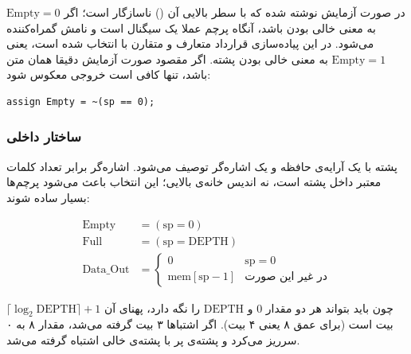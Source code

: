 \documentclass[10pt,a4paper]{article}
\begin{document}
 در صورت آزمایش نوشته شده  که با سطر بالایی آن () ناسازگار است؛ اگر $\mathrm{Empty}=0$ به معنی خالی بودن باشد، آنگاه پرچم عملا یک سیگنال  است و نامش گمراه‌کننده می‌شود. در این پیاده‌سازی قرارداد متعارف و متقارن با  انتخاب شده است، یعنی $\mathrm{Empty}=1$ به معنی خالی بودن پشته. اگر مقصود صورت آزمایش دقیقا همان متن باشد، تنها کافی است خروجی معکوس شود:

\begin{latin}
\begin{lstlisting}[style=verilog,numbers=none]
assign Empty = ~(sp == 0);
\end{lstlisting}
\end{latin}

\subsubsection*{ساختار داخلی}

پشته با یک آرایه‌ی حافظه و یک اشاره‌گر توصیف می‌شود. اشاره‌گر  برابر {تعداد کلمات معتبر} داخل پشته است، نه اندیس خانه‌ی بالایی؛ این انتخاب باعث می‌شود پرچم‌ها بسیار ساده شوند:

\[
\begin{aligned}
\mathrm{Empty} &= (\mathrm{sp} = 0)\\
\mathrm{Full}  &= (\mathrm{sp} = \mathrm{DEPTH})\\
\mathrm{Data\_Out} &= \begin{cases} 0 & \mathrm{sp} = 0\\ \mathrm{mem}[\mathrm{sp}-1] & \text{در غیر این صورت}\end{cases}
\end{aligned}
\]

چون  باید بتواند هر دو مقدار $0$ و $\mathrm{DEPTH}$ را نگه دارد، پهنای آن $\lceil \log_2 \mathrm{DEPTH}\rceil + 1$ بیت است (برای عمق ۸ یعنی ۴ بیت). اگر اشتباها ۳ بیت گرفته می‌شد، مقدار ۸ به ۰ سرریز می‌کرد و پشته‌ی پر با پشته‌ی خالی اشتباه گرفته می‌شد.
\end{document}

